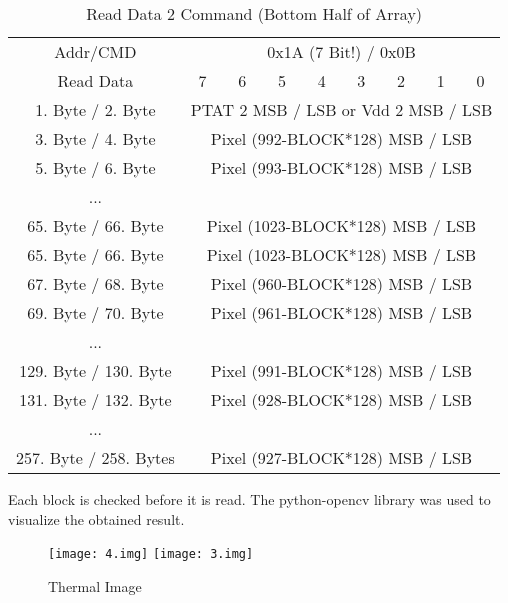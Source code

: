 \documentclass[thesis]{deutez}
\begin{document}
\begin{table}[h!]
	\begin{center}
		\caption{Read Data 2 Command (Bottom Half of Array)}
		\begin{tabular}{|c|c|c|c|c|c|c|c|c|} 
			\hline
			Addr/CMD & \multicolumn{8}{c|}{0x1A (7 Bit!) / 0x0B}\\\cline{1-9}
			Read Data &7&6&5&4&3&2&1&0\\
			\cline{1-9}
			1. Byte / 2. Byte & \multicolumn{8}{c|}{PTAT 2 MSB / LSB or Vdd 2 MSB / LSB}\\\cline{1-9}
			3. Byte / 4. Byte & \multicolumn{8}{c|}{Pixel (992-BLOCK*128) MSB / LSB}\\\cline{1-9}
			5. Byte / 6. Byte & \multicolumn{8}{c|}{Pixel (993-BLOCK*128) MSB / LSB}\\\cline{1-9}
			... & \multicolumn{8}{c|}{}\\\cline{1-9}	
			65. Byte / 66. Byte & \multicolumn{8}{c|}{Pixel (1023-BLOCK*128) MSB / LSB}\\\cline{1-9}
			
			65. Byte / 66. Byte & \multicolumn{8}{c|}{Pixel (1023-BLOCK*128) MSB / LSB}\\\cline{1-9}
			
			67. Byte / 68. Byte & \multicolumn{8}{c|}{Pixel (960-BLOCK*128) MSB / LSB}\\\cline{1-9}
			
			69. Byte / 70. Byte & \multicolumn{8}{c|}{Pixel (961-BLOCK*128) MSB / LSB}\\\cline{1-9}
			
			... & \multicolumn{8}{c|}{}\\\cline{1-9}
			
			129. Byte / 130. Byte & \multicolumn{8}{c|}{Pixel (991-BLOCK*128) MSB / LSB}\\\cline{1-9}
			
			131. Byte / 132. Byte & \multicolumn{8}{c|}{Pixel (928-BLOCK*128) MSB / LSB}\\\cline{1-9}
			
			...& \multicolumn{8}{c|}{}\\\cline{1-9}
			
			257. Byte / 258. Bytes& \multicolumn{8}{c|}{Pixel (927-BLOCK*128) MSB / LSB}\\\cline{1-9}
			
		\end{tabular}
	\end{center}
\end{table}
\FloatBarrier
Each block is checked before it is read. The python-opencv\cite{cv2} library was used to visualize the obtained result.
\begin{figure}[h!]
	\centering
	\texttt{[image: 4.img]}
	\texttt{[image: 3.img]}
	\caption{Thermal Image}
\end{figure}
\FloatBarrier
\end{document}
